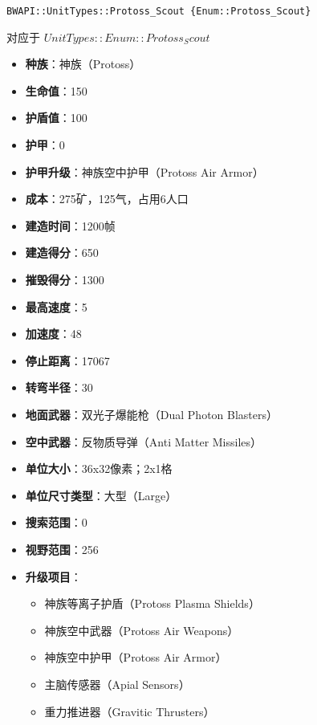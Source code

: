 \begin{tcolorbox}[colback=white, colframe=black!60!white, title=Protoss\_Scout(), arc=0mm]
    \begin{verbatim}
BWAPI::UnitTypes::Protoss_Scout {Enum::Protoss_Scout}
    \end{verbatim}
    对应于  $ UnitTypes::Enum::Protoss_Scout $ 
    \begin{itemize}
        \item \textbf{种族}：神族（Protoss）
        \item \textbf{生命值}：150
        \item \textbf{护盾值}：100
        \item \textbf{护甲}：0
        \item \textbf{护甲升级}：神族空中护甲（Protoss Air Armor）
        \item \textbf{成本}：275矿，125气，占用6人口
        \item \textbf{建造时间}：1200帧
        \item \textbf{建造得分}：650
        \item \textbf{摧毁得分}：1300
        \item \textbf{最高速度}：5
        \item \textbf{加速度}：48
        \item \textbf{停止距离}：17067
        \item \textbf{转弯半径}：30
        \item \textbf{地面武器}：双光子爆能枪（Dual Photon Blasters）
        \item \textbf{空中武器}：反物质导弹（Anti Matter Missiles）
        \item \textbf{单位大小}：36x32像素；2x1格
        \item \textbf{单位尺寸类型}：大型（Large）
        \item \textbf{搜索范围}：0
        \item \textbf{视野范围}：256
        \item \textbf{升级项目}：
            \begin{itemize}
                \item 神族等离子护盾（Protoss Plasma Shields）
                \item 神族空中武器（Protoss Air Weapons）
                \item 神族空中护甲（Protoss Air Armor）
                \item 主脑传感器（Apial Sensors）
                \item 重力推进器（Gravitic Thrusters）

\end{itemize}
\end{itemize}
\end{tcolorbox}
